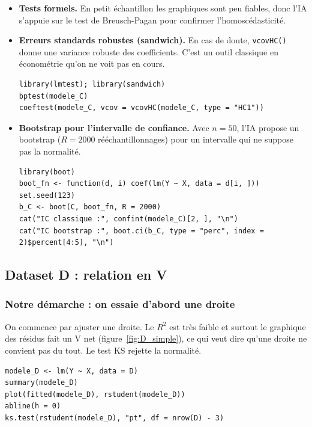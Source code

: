 \documentclass[11pt,a4paper]{article}
\begin{document}
\begin{itemize}
    \item \textbf{Tests formels.} En petit échantillon les graphiques sont peu fiables, donc l'IA s'appuie sur le test de Breusch-Pagan pour confirmer l'homoscédasticité.

    \item \textbf{Erreurs standards robustes (sandwich).} En cas de doute, \texttt{vcovHC()} donne une variance robuste des coefficients. C'est un outil classique en économétrie qu'on ne voit pas en cours.

\begin{lstlisting}
library(lmtest); library(sandwich)
bptest(modele_C)
coeftest(modele_C, vcov = vcovHC(modele_C, type = "HC1"))
\end{lstlisting}

    \item \textbf{Bootstrap pour l'intervalle de confiance.} Avec $n = 50$, l'IA propose un bootstrap ($R = 2000$ rééchantillonnages) pour un intervalle qui ne suppose pas la normalité.

\begin{lstlisting}
library(boot)
boot_fn <- function(d, i) coef(lm(Y ~ X, data = d[i, ]))
set.seed(123)
b_C <- boot(C, boot_fn, R = 2000)
cat("IC classique :", confint(modele_C)[2, ], "\n")
cat("IC bootstrap :", boot.ci(b_C, type = "perc", index = 2)$percent[4:5], "\n")
\end{lstlisting}

\end{itemize}

\subsection{Dataset D : relation en V}

\subsubsection{Notre démarche : on essaie d'abord une droite}

On commence par ajuster une droite. Le $R^2$ est très faible et surtout le graphique des résidus fait un V net (figure~\ref{fig:D_simple}), ce qui veut dire qu'une droite ne convient pas du tout. Le test KS rejette la normalité.

\begin{lstlisting}
modele_D <- lm(Y ~ X, data = D)
summary(modele_D)
plot(fitted(modele_D), rstudent(modele_D))
abline(h = 0)
ks.test(rstudent(modele_D), "pt", df = nrow(D) - 3)
\end{lstlisting}
\end{document}
